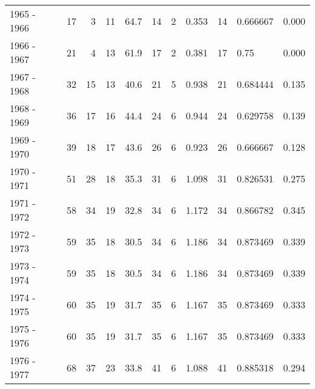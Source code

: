 \begin{tabular}{lrrrrrrrllr}
1965 - 1966 &       17 &        3 &                11 &              64.7 &                      14 &                          2 &       0.353 &            14 &   0.666667 &             0.000 \\
1966 - 1967 &       21 &        4 &                13 &              61.9 &                      17 &                          2 &       0.381 &            17 &       0.75 &             0.000 \\
1967 - 1968 &       32 &       15 &                13 &              40.6 &                      21 &                          5 &       0.938 &            21 &   0.684444 &             0.135 \\
1968 - 1969 &       36 &       17 &                16 &              44.4 &                      24 &                          6 &       0.944 &            24 &   0.629758 &             0.139 \\
1969 - 1970 &       39 &       18 &                17 &              43.6 &                      26 &                          6 &       0.923 &            26 &   0.666667 &             0.128 \\
1970 - 1971 &       51 &       28 &                18 &              35.3 &                      31 &                          6 &       1.098 &            31 &   0.826531 &             0.275 \\
1971 - 1972 &       58 &       34 &                19 &              32.8 &                      34 &                          6 &       1.172 &            34 &   0.866782 &             0.345 \\
1972 - 1973 &       59 &       35 &                18 &              30.5 &                      34 &                          6 &       1.186 &            34 &   0.873469 &             0.339 \\
1973 - 1974 &       59 &       35 &                18 &              30.5 &                      34 &                          6 &       1.186 &            34 &   0.873469 &             0.339 \\
1974 - 1975 &       60 &       35 &                19 &              31.7 &                      35 &                          6 &       1.167 &            35 &   0.873469 &             0.333 \\
1975 - 1976 &       60 &       35 &                19 &              31.7 &                      35 &                          6 &       1.167 &            35 &   0.873469 &             0.333 \\
1976 - 1977 &       68 &       37 &                23 &              33.8 &                      41 &                          6 &       1.088 &            41 &   0.885318 &             0.294 \\

\end{tabular}
